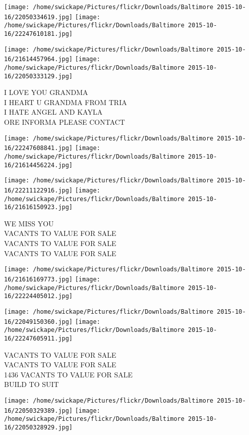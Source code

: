 \documentclass[10pt,letterpaper]{article}
\begin{document}
\texttt{[image: /home/swickape/Pictures/flickr/Downloads/Baltimore 2015-10-16/22050334619.jpg]}
\texttt{[image: /home/swickape/Pictures/flickr/Downloads/Baltimore 2015-10-16/22247610181.jpg]}

\texttt{[image: /home/swickape/Pictures/flickr/Downloads/Baltimore 2015-10-16/21614457964.jpg]}
\texttt{[image: /home/swickape/Pictures/flickr/Downloads/Baltimore 2015-10-16/22050333129.jpg]}

I LOVE YOU GRANDMA\\
I HEART U GRANDMA FROM TRIA\\
I HATE ANGEL AND KAYLA\\
ORE INFORMA PLEASE CONTACT\\
\pagebreak

\texttt{[image: /home/swickape/Pictures/flickr/Downloads/Baltimore 2015-10-16/22247608841.jpg]}
\texttt{[image: /home/swickape/Pictures/flickr/Downloads/Baltimore 2015-10-16/21614456224.jpg]}

\texttt{[image: /home/swickape/Pictures/flickr/Downloads/Baltimore 2015-10-16/22211122916.jpg]}
\texttt{[image: /home/swickape/Pictures/flickr/Downloads/Baltimore 2015-10-16/21616150923.jpg]}

WE MISS YOU\\
VACANTS TO VALUE FOR SALE\\
VACANTS TO VALUE FOR SALE\\
VACANTS TO VALUE FOR SALE\\
\pagebreak

\texttt{[image: /home/swickape/Pictures/flickr/Downloads/Baltimore 2015-10-16/21616169773.jpg]}
\texttt{[image: /home/swickape/Pictures/flickr/Downloads/Baltimore 2015-10-16/22224405012.jpg]}

\texttt{[image: /home/swickape/Pictures/flickr/Downloads/Baltimore 2015-10-16/22049150360.jpg]}
\texttt{[image: /home/swickape/Pictures/flickr/Downloads/Baltimore 2015-10-16/22247605911.jpg]}

VACANTS TO VALUE FOR SALE\\
VACANTS TO VALUE FOR SALE\\
1436 VACANTS TO VALUE FOR SALE\\
BUILD TO SUIT\\
\pagebreak

\texttt{[image: /home/swickape/Pictures/flickr/Downloads/Baltimore 2015-10-16/22050329389.jpg]}
\texttt{[image: /home/swickape/Pictures/flickr/Downloads/Baltimore 2015-10-16/22050328929.jpg]}
\end{document}
